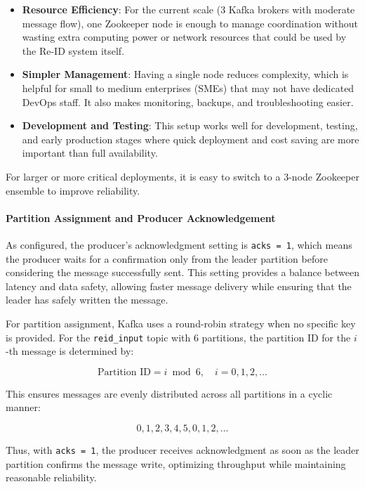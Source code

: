 \documentclass[../main.tex]{subfiles}
\begin{document}
\begin{itemize}
    \item \textbf{Resource Efficiency}: For the current scale (3 Kafka brokers with moderate message flow), one Zookeeper node is enough to manage coordination without wasting extra computing power or network resources that could be used by the Re-ID system itself.
    
    \item \textbf{Simpler Management}: Having a single node reduces complexity, which is helpful for small to medium enterprises (SMEs) that may not have dedicated DevOps staff. It also makes monitoring, backups, and troubleshooting easier.
    
    \item \textbf{Development and Testing}: This setup works well for development, testing, and early production stages where quick deployment and cost saving are more important than full availability.
\end{itemize}

For larger or more critical deployments, it is easy to switch to a 3-node Zookeeper ensemble to improve reliability.

\paragraph{Partition Assignment and Producer Acknowledgement}

As configured, the producer's acknowledgment setting is \texttt{acks = 1}, which means the producer waits for a confirmation only from the leader partition before considering the message successfully sent. This setting provides a balance between latency and data safety, allowing faster message delivery while ensuring that the leader has safely written the message.

For partition assignment, Kafka uses a round-robin strategy when no specific key is provided. For the \texttt{reid\_input} topic with 6 partitions, the partition ID for the \(i\)-th message is determined by:

\begin{equation}
    \text{Partition ID} = i \bmod 6, \quad i = 0, 1, 2, \ldots
\end{equation}

This ensures messages are evenly distributed across all partitions in a cyclic manner:

\[
0, 1, 2, 3, 4, 5, 0, 1, 2, \ldots
\]

Thus, with \texttt{acks = 1}, the producer receives acknowledgment as soon as the leader partition confirms the message write, optimizing throughput while maintaining reasonable reliability.
\end{document}

